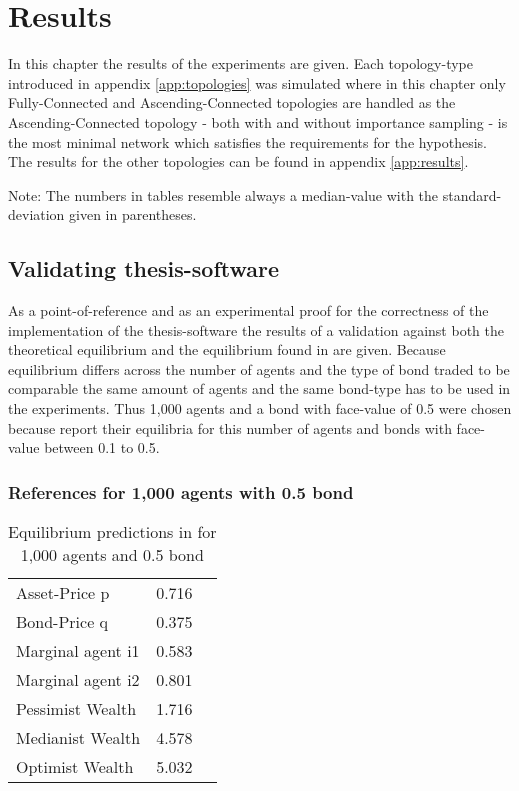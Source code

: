 \documentclass[Bachelorarbeit.tex]{subfiles}
\begin{document}
\graphicspath{{./figures/results/}}	%

\chapter{Results}
\label{ch:results}

In this chapter the results of the experiments are given. Each topology-type introduced in appendix \ref{app:topologies} was simulated where in this chapter only Fully-Connected and Ascending-Connected topologies are handled as the Ascending-Connected topology - both with and without importance sampling - is the most minimal network which satisfies the requirements for the hypothesis. The results for the other topologies can be found in appendix \ref{app:results}.

Note: The numbers in tables resemble always a median-value with the standard-deviation given in parentheses.

\section{Validating thesis-software}
As  a point-of-reference and as an experimental proof for the correctness of the implementation of the thesis-software the results of a validation against both the theoretical equilibrium and the equilibrium found in \cite{Breuer2015} are given. Because equilibrium differs across the number of agents and the type of bond traded to be comparable the same amount of agents and the same bond-type has to be used in the experiments. Thus 1,000 agents and a bond with face-value of 0.5 were chosen because \cite{Breuer2015} report their equilibria for this number of agents and bonds with face-value between 0.1 to 0.5.

\subsection{References for 1,000 agents with 0.5 bond}

\begin{table}[H]
	\centering
	\caption{Equilibrium predictions in \cite{Breuer2015} for 1,000 agents and 0.5 bond}
	\begin{tabular} { l c r }
		\hline
		Asset-Price p & 0.716 \\
		Bond-Price q & 0.375 \\
		Marginal agent i1 & 0.583 \\
		Marginal agent i2 & 0.801 \\
		\hline
		Pessimist Wealth & 1.716 \\
		Medianist Wealth & 4.578 \\
		Optimist Wealth & 5.032 \\
		\hline
	\end{tabular}
	\label{tab:equilibrium_BREUER_1000}
\end{table}
\end{document}
